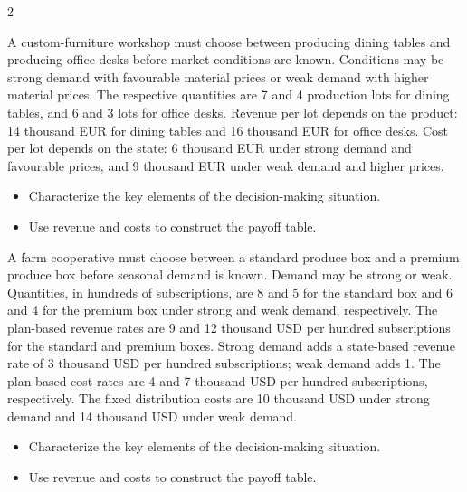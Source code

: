 \begin{multicols}{2}
		\columnbreak 
		
			A custom-furniture workshop must choose between producing dining tables
		and producing office desks before market conditions are known. Conditions may be strong demand with favourable material prices or weak demand with higher material prices. The respective quantities are 7 and 4 production lots for dining tables, and 6 and 3 lots for office desks. Revenue per lot depends on the product: 14 thousand EUR for dining tables and 16 thousand EUR for office desks. Cost per lot depends on the state: 6 thousand EUR under strong demand and favourable prices, and 9 thousand EUR under weak demand and higher prices.
		
		\begin{itemize}
			\item [\textbf{(C1)}] Characterize the key elements of the decision-making situation. 
			\item [\textbf{(C3)}] Use revenue and costs to construct the payoff table. 
		\end{itemize}
		
		
		A farm cooperative must choose between a standard produce box and a premium produce box before seasonal demand is known. Demand may be strong or weak. Quantities, in hundreds of subscriptions, are 8 and 5 for the standard box and 6 and 4 for the premium box under strong and weak demand, respectively. The plan-based revenue rates are 9 and 12 thousand USD per hundred subscriptions for the standard and premium boxes. Strong demand adds a state-based revenue rate of 3 thousand USD per hundred subscriptions; weak demand adds 1. The plan-based cost rates are 4 and 7 thousand USD per hundred subscriptions, respectively. The fixed distribution costs are 10 thousand USD under strong demand and 14 thousand USD under weak demand.
		
		\begin{itemize}
			\item [\textbf{(C1)}] Characterize the key elements of the decision-making situation. 
			\item [\textbf{(C3)}] Use revenue and costs to construct the payoff table. 
		\end{itemize}
		

\end{multicols}
